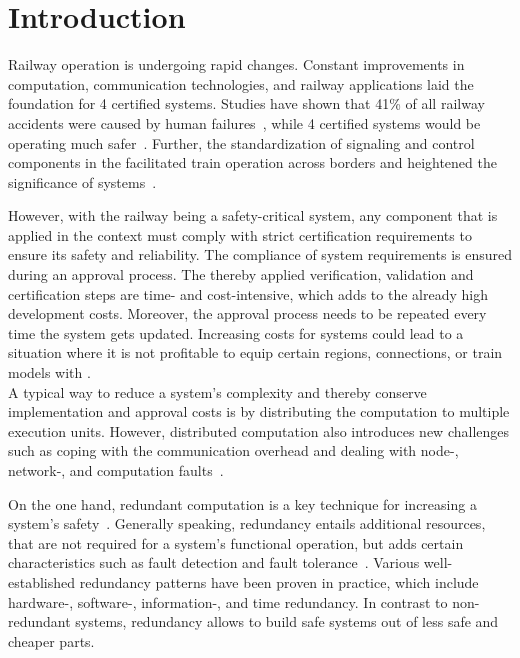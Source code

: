 \chapter{Introduction}


Railway operation is undergoing rapid changes.
%
Constant improvements in computation, communication technologies, and railway applications laid the foundation for  4 certified  systems.
Studies have shown that 41\% of all railway accidents were caused by human failures~\cite{StudyRailwayAccidents}, while  4 certified  systems would be operating much safer~\cite{SallekSIL}.
Further, the standardization of signaling and control components in the  facilitated train operation across borders and heightened the significance of  systems~\cite{YIN2017RNDofATO}.

However, with the railway being a safety-critical system, any component that is applied in the  context must comply with strict certification requirements to ensure its safety and reliability.
The compliance of system requirements is ensured during an approval process.
The thereby applied verification, validation and certification steps are time- and cost-intensive, which adds to the already high development costs.
Moreover, the approval process needs to be repeated every time the system gets updated.
Increasing costs for  systems could lead to a situation where it is not profitable to equip certain regions, connections, or train models with .
\\

A typical way to reduce a system's complexity and thereby conserve implementation and approval costs is by distributing the computation to multiple execution units.
However, distributed computation also introduces new challenges such as coping with the communication overhead and dealing with node-, network-, and computation faults~\cite{DistributedSafety2020}.

On the one hand, redundant computation is a key technique for increasing a system's safety~\cite{TanenbaumSteen07}.
Generally speaking, redundancy entails additional resources, that are not required for a system's functional operation, but adds certain characteristics such as fault detection and fault tolerance~\cite{BarryFaultToleranceAnalysis}.
Various well-established redundancy patterns have been proven in practice, which include hardware-, software-, information-, and time redundancy.
In contrast to non-redundant systems, redundancy allows to build safe systems out of less safe and cheaper parts.

